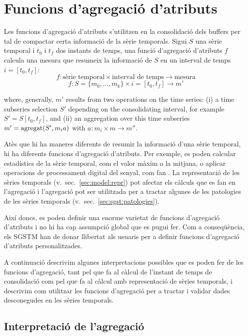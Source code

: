 
\section{Funcions d'agregació d'atributs}
\label{sec:model:interpolador}
\label{sec:model:agregador}


Les funcions d'agregació d'atributs s'utilitzen en la consolidació
dels buffers per tal de compactar certa informació de la sèrie
temporals. Sigui $S$ una sèrie temporal i $t_0$ i $t_f$ dos instants
de temps, una funció d'agregació d'atributs $f$ calcula una mesura que
resumeix la informació de $S$ en un interval de temps $i=[t_0,t_f]$:
\[
f: \text{sèrie temporal} \times \text{interval de temps}
\longrightarrow \text{mesura}
\]
\[
f: S=\{m_0,\ldots,m_k\} \times i=[t_0,t_f] \longrightarrow  m'
\]

where, generally, $m'$ results from two operations on the time series: (i) a time subseries selection $S'$ depending on the consolidating interval, for example $S' = S[t_0,t_f]$, and (ii) an aggregation over this time subseries  $m' = \operatorname*{agregat}(S',m_i a)$ with $a: m_i \times m\rightarrow m''$. 

Atès que hi ha maneres diferents de resumir la informació d'una sèrie
temporal, hi ha diferents funcions d'agregació d'atributs. Per
exemple, es poden calcular estadístics de la sèrie temporal, com el
valor màxim o la mitjana, o aplicar operacions de processament digital
del senyal, com fan \textcite{zhang11}.  La representació de les
sèries temporals (v.\ sec.~\ref{sec:model:repr}) pot afectar els
càlculs que es fan en l'agregació i l'agregació pot ser utilitzada per
a tractar algunes de les patologies de les sèries temporals
(v.\ sec.~\ref{sec:sgst:patologies}).


Així doncs, es poden definir una enorme varietat de funcions
d'agregació d'atributs i no hi ha cap assumpció global que es pugui
fer. Com a conseqüència, els SGSTM han de donar llibertat als usuaris
per a definir funcions d'agregació d'atributs personalitzades.

A continuació descrivim algunes interpretacions possibles que es poden
fer de les funcions d'agregació, tant pel que fa al càlcul de
l'instant de temps de consolidació com pel que fa al càlcul amb
representació de sèries temporals, i descrivim com utilitzar les
funcions d'agregació per a tractar i validar dades desconegudes en les
sèries temporals.




\subsection{Interpretació de l'agregació}

